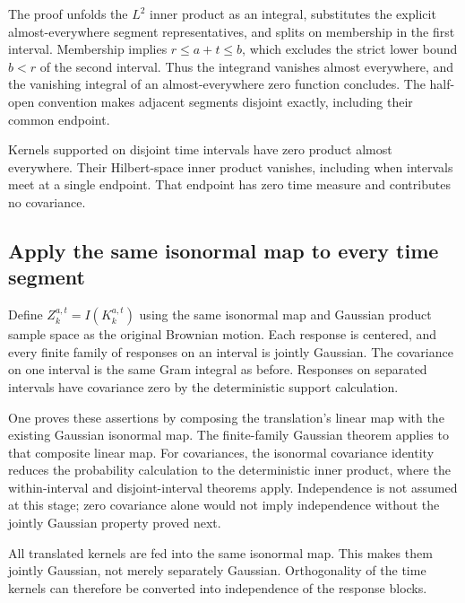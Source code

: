 \documentclass[11pt,a4paper]{report}
\begin{document}
The proof unfolds the \(L^{2}\) inner product as an integral, substitutes the explicit almost-everywhere segment representatives, and splits on membership in the first interval. Membership implies \(r\le a+t\le b\), which excludes the strict lower bound \(b<r\) of the second interval. Thus the integrand vanishes almost everywhere, and the vanishing integral of an almost-everywhere zero function concludes. The half-open convention makes adjacent segments disjoint exactly, including their common endpoint.



Kernels supported on disjoint time intervals have zero product almost everywhere. Their Hilbert-space inner product vanishes, including when intervals meet at a single endpoint. That endpoint has zero time measure and contributes no covariance.

\subsection{\texorpdfstring{Apply the same isonormal map to every time segment}{Apply the same isonormal map to every time segment}}
\label{report-step-KineticLangevin-BrownianSegments-lean-3}


Define \(Z_k^{a,t}=I(K_k^{a,t})\) using the same isonormal map and Gaussian product sample space as the original Brownian motion. Each response is centered, and every finite family of responses on an interval is jointly Gaussian. The covariance on one interval is the same Gram integral as before. Responses on separated intervals have covariance zero by the deterministic support calculation.



One proves these assertions by composing the translation's linear map with the existing Gaussian isonormal map. The finite-family Gaussian theorem applies to that composite linear map. For covariances, the isonormal covariance identity reduces the probability calculation to the deterministic inner product, where the within-interval and disjoint-interval theorems apply. Independence is not assumed at this stage; zero covariance alone would not imply independence without the jointly Gaussian property proved next.



All translated kernels are fed into the same isonormal map. This makes them jointly Gaussian, not merely separately Gaussian. Orthogonality of the time kernels can therefore be converted into independence of the response blocks.
\end{document}
